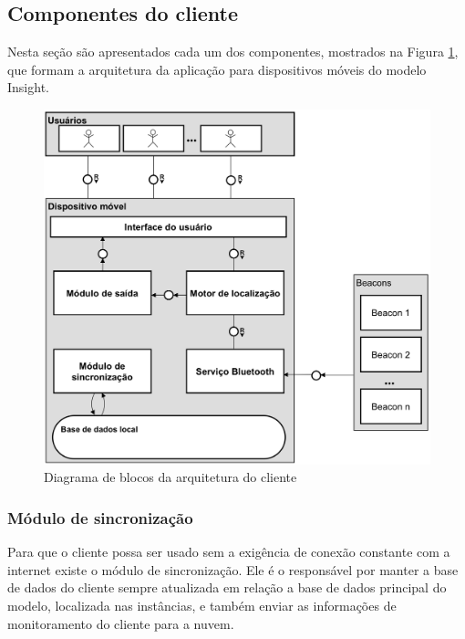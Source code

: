 \documentclass[english,brazilian]{UNISINOSmonografia}
\begin{document}
	\subsection{Componentes do cliente}
Nesta seção são apresentados cada um dos componentes, mostrados na Figura \ref{fig:arquiteturaCliente}, que formam a arquitetura da aplicação para dispositivos móveis do modelo Insight.

\begin{figure}[!ht]
	\caption{Diagrama de blocos da arquitetura do cliente}
	\label{fig:arquiteturaCliente}
	\centering%
	\begin{minipage}{.8\textwidth}
		\includegraphics[width=\textwidth]{imgs/arquiteturaCliente.png}
	\end{minipage}
\end{figure}

		\subsubsection{Módulo de sincronização}
Para que o cliente possa ser usado sem a exigência de conexão constante com a internet existe o módulo de sincronização. Ele é o responsável por manter a base de dados do cliente sempre atualizada em relação a base de dados principal do modelo, localizada nas instâncias, e também enviar as informações de monitoramento do cliente para a nuvem.
\end{document}
